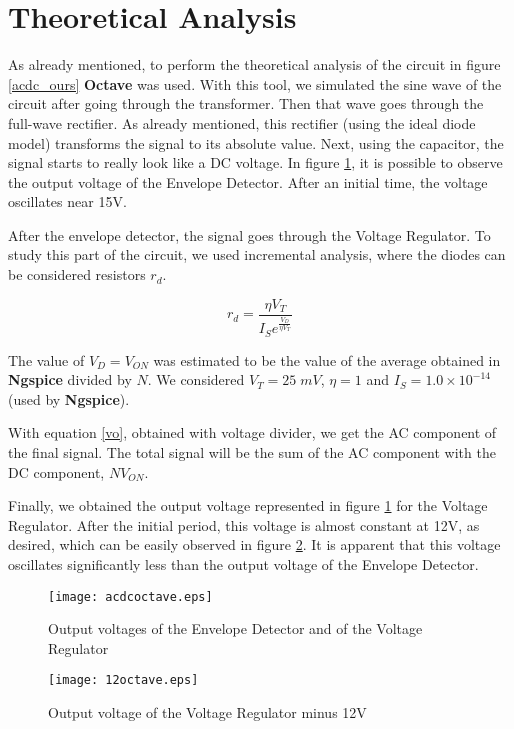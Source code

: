 \newpage
\section{Theoretical Analysis}
\label{sec:analysis}

As already mentioned, to perform the theoretical analysis of the circuit in figure \ref{acdc_ours} {\bf Octave} was used. With this tool, we simulated the sine wave of the circuit after going through the transformer. Then that wave goes through the full-wave rectifier. As already mentioned, this rectifier (using the ideal diode model) transforms the signal to its absolute value. Next, using the capacitor, the signal starts to really look like a DC voltage. In figure \ref{fig:acdcoc}, it is possible to observe the output voltage of the Envelope Detector. After an initial time, the voltage oscillates near 15V.

After the envelope detector, the signal goes through the Voltage Regulator. To study this part of the circuit, we used incremental analysis, where the diodes can be considered resistors $r_d$.

\begin{equation}
        r_d = \frac{\eta V_T}{I_Se^{\frac{V_D}{\eta V_T}}}
        \label{rd}
\end{equation}

The value of $V_D = V_{ON}$ was estimated to be the value of the average obtained in {\bf Ngspice} divided by $N$. We considered $V_T=25\;mV$, $\eta = 1$ and $I_S = 1.0 \times 10^{-14}$ (used by {\bf Ngspice}).

With equation \ref{vo}, obtained with voltage divider, we get the AC component of the final signal. The total signal will be the sum of the AC component with the DC component, $N V_{ON}$.

Finally, we obtained the output voltage represented in figure \ref{fig:acdcoc} for the Voltage Regulator. After the initial period, this voltage is almost constant at 12V, as desired, which can be easily observed in figure \ref{fig:vo-12}. It is apparent that this voltage oscillates significantly less than the output voltage of the Envelope Detector.


\begin{figure}[H]
  \centering
  \texttt{[image: acdcoctave.eps]}
  \caption{Output voltages of the Envelope Detector and of the Voltage Regulator}
  \label{fig:acdcoc}
\end{figure}

\begin{figure}[H]
  \centering
  \texttt{[image: 12octave.eps]}
  \caption{Output voltage of the Voltage Regulator minus 12V}
  \label{fig:vo-12}
\end{figure}
